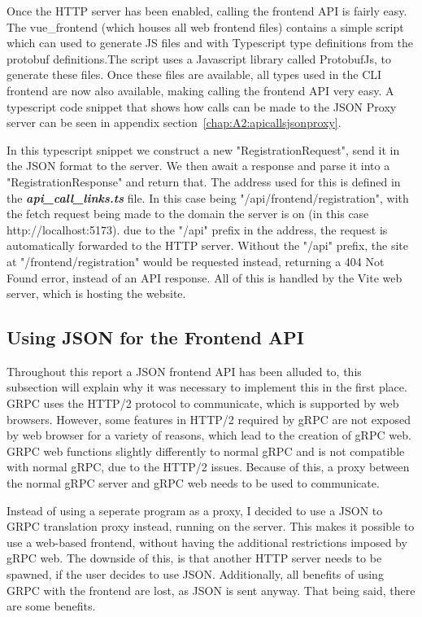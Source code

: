 Once the HTTP server has been enabled, calling the frontend API is fairly easy. The vue\_frontend (which houses all web frontend files) contains a simple script which can used to generate JS files and with Typescript type definitions from the protobuf definitions.The script uses a Javascript library called ProtobufJs, to generate these files. Once these files are available, all types used in the CLI frontend are now also available, making calling the frontend API very easy. A typescript code snippet that shows how calls can be made to the JSON Proxy server can be seen in appendix section~\ref{chap:A2:apicallsjsonproxy}.


In this typescript snippet we construct a new "RegistrationRequest", send it in the JSON format to the server. We then await a response and parse it into a "RegistrationResponse" and return that. The address used for this is defined in the \textit{\textbf{api\_call\_links.ts}} file. In this case being "/api/frontend/registration", with the fetch request being made to the domain the server is on (in this case http://localhost:5173). due to the "/api" prefix in the address, the request is automatically forwarded to the HTTP server. Without the "/api" prefix, the site at "/frontend/registration" would be requested instead, returning a 404 Not Found error, instead of an API response. All of this is handled by the Vite web server, which is hosting the website.

\subsection{Using JSON for the Frontend API} \label{sec:chapimpl:frontend:json}
Throughout this report a JSON frontend API has been alluded to, this subsection will explain why it was necessary to implement this in the first place. GRPC uses the HTTP/2 protocol to communicate, which is supported by web browsers. However, some features in HTTP/2 required by gRPC are not exposed by web browser \cite{grpcWeb} for a variety of reasons, which lead to the creation of gRPC web. GRPC web functions slightly differently to normal gRPC and is not compatible with normal gRPC, due to the HTTP/2 issues. Because of this, a proxy between the normal gRPC server and gRPC web needs to be used to communicate.

Instead of using a seperate program as a proxy, I decided to use a JSON to GRPC translation proxy instead, running on the server. This makes it possible to use a web-based frontend, without having the additional restrictions imposed by gRPC web. The downside of this, is that another HTTP server needs to be spawned, if the user decides to use JSON. Additionally, all benefits of using GRPC with the frontend are lost, as JSON is sent anyway. That being said, there are some benefits.

